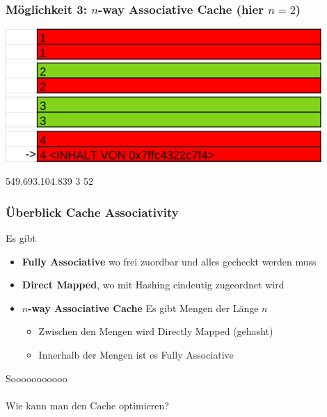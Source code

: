 \documentclass{beamer}
\begin{document}
\begin{frame}
\frametitle{M\"oglichkeit 3: $n$-way Associative Cache (hier $n=2$)}
\centerline{\includegraphics[width=12cm]{nac2.png}}
{\color{brown}549.693.104.839} {\color{blue}3} {\color{orange}52}
\end{frame}

\begin{frame}
\frametitle{\"Uberblick Cache Associativity}
Es gibt
\begin{itemize}
    \pause
    \item \textbf{Fully Associative} wo frei zuordbar und alles gecheckt werden muss
    \pause
    \item \textbf{Direct Mapped}, wo mit Hashing eindeutig zugeordnet wird
    \pause
    \item \textbf{$n$-way Associative Cache} Es gibt Mengen der L\"ange $n$
    \pause
    \begin{itemize}
        \item Zwischen den Mengen wird Directly Mapped (gehasht)
        \pause
        \item Innerhalb der Mengen ist es Fully Associative
    \end{itemize}
\end{itemize}
\end{frame}



%
%
\begin{frame}
\centering
{
\Huge Sooooooooooo\\~\\
}
\pause
Wie kann man den Cache optimieren?
\end{frame}

%
% 
\end{document}
